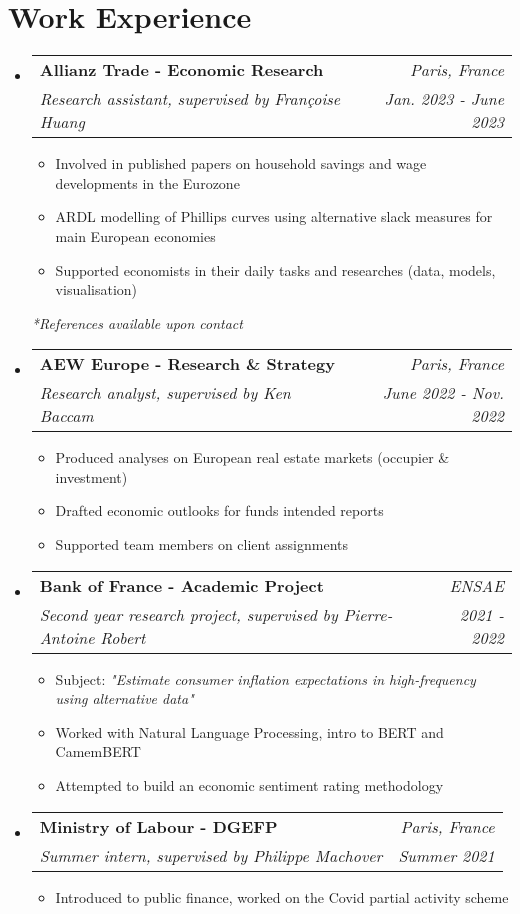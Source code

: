 \documentclass[letterpaper,10pt]{article}
\makeatletter
\newcommand{\resumeItem}[1]{
    \item\small{
            {#1 \vspace{-2pt}}
    }
}
\newcommand{\resumeSubheading}[4]{
    \vspace{-2pt}\item
    \begin{tabular*}{0.97\textwidth}[t]{l@{\extracolsep{\fill}}r}
        \textbf{#1}       & #2                 \\
        \textit{\small#3} & \textit{\small #4} \\
    \end{tabular*}\vspace{-7pt}
}
\newcommand{\resumeSubHeadingListStart}{\begin{itemize}[leftmargin=0.15in, label={}]}
\newcommand{\resumeSubHeadingListEnd}{\end{itemize}}
\newcommand{\resumeItemListStart}{\begin{itemize}}
\newcommand{\resumeItemListEnd}{\end{itemize}\vspace{-5pt}}
\makeatother
\begin{document}
\section{Work Experience}
\resumeSubHeadingListStart
\resumeSubheading
{Allianz Trade - Economic Research}{\textit{\small{Paris, France}}}
{Research assistant, supervised by Françoise Huang}{Jan. 2023 - June 2023}
\resumeItemListStart
\resumeItem{Involved in published papers on household savings and wage developments in the Eurozone}
\resumeItem{ARDL modelling of Phillips curves using alternative slack measures for main European economies}
\resumeItem{Supported economists in their daily tasks and researches (data, models, visualisation)}
\resumeItemListEnd
\quad \small{\textit{*References available upon contact}}
\vspace{.1cm}

\resumeSubheading
{AEW Europe - Research \& Strategy}{\textit{\small{Paris, France}}}
{Research analyst, supervised by Ken Baccam}{June 2022 - Nov. 2022}
\resumeItemListStart
\resumeItem{Produced analyses on European real estate markets (occupier \& investment)}
\resumeItem{Drafted economic outlooks for funds intended reports}
\resumeItem{Supported team members on client assignments}
\resumeItemListEnd
\vspace{.1cm}

\resumeSubheading
{Bank of France - Academic Project}{\textit{\small{ENSAE}}}
{Second year research project, supervised by Pierre-Antoine Robert}{2021 - 2022}
\resumeItemListStart
\resumeItem{Subject: \textit{"Estimate consumer inflation expectations in high-frequency using alternative data"}}
\resumeItem{Worked with Natural Language Processing, intro to BERT and CamemBERT}
\resumeItem{Attempted to build an economic sentiment rating methodology}
\resumeItemListEnd
\vspace{.1cm}

\resumeSubheading
{Ministry of Labour - DGEFP}{\textit{\small{Paris, France}}}
{Summer intern, supervised by Philippe Machover}{Summer 2021}
\resumeItemListStart
\resumeItem{Introduced to public finance, worked on the Covid partial activity scheme}
\resumeItemListEnd
\resumeSubHeadingListEnd

\end{document}
